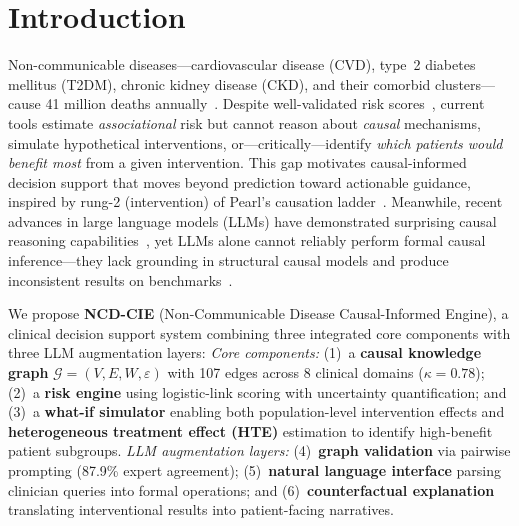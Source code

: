 \documentclass[runningheads]{llncs}
\begin{document}
\section{Introduction}\label{sec:intro}

Non-communicable diseases---cardiovascular disease (CVD), type~2
diabetes mellitus (T2DM), chronic kidney disease (CKD), and their
comorbid clusters---cause 41 million deaths
annually~\cite{who2021ncd}.
Despite well-validated risk scores~\cite{dagostino2008,hippisley2017qrisk3,score22021},
current tools estimate \emph{associational} risk but cannot reason about
\emph{causal} mechanisms, simulate hypothetical interventions, or---critically---identify
\emph{which patients would benefit most} from a given intervention.
This gap motivates causal-informed decision support that moves beyond
prediction toward actionable guidance, inspired by rung-2 (intervention)
of Pearl's causation ladder~\cite{pearl2018book}.
Meanwhile, recent advances in large language models (LLMs) have
demonstrated surprising causal reasoning
capabilities~\cite{ma2024causal,kiciman2023causal}, yet LLMs alone
cannot reliably perform formal causal inference---they lack grounding
in structural causal models and produce inconsistent results on
benchmarks~\cite{jin2023cladder}.

We propose \textbf{NCD-CIE} (Non-Communicable Disease Causal-Informed
Engine), a clinical decision support system combining three integrated
core components with three LLM augmentation layers:
\noindent\emph{Core components:}
(1)~a \textbf{causal knowledge graph} $\mathcal{G}=(V,E,W,\varepsilon)$
  with 107 edges across 8 clinical domains ($\kappa=0.78$);
(2)~a \textbf{risk engine} using logistic-link scoring with
  uncertainty quantification; and
(3)~a \textbf{what-if simulator} enabling both population-level
  intervention effects and \textbf{heterogeneous treatment effect (HTE)}
  estimation to identify high-benefit patient subgroups.
\emph{LLM augmentation layers:}
(4)~\textbf{graph validation} via pairwise prompting (87.9\% expert
  agreement);
(5)~\textbf{natural language interface} parsing clinician queries
  into formal operations; and
(6)~\textbf{counterfactual explanation} translating interventional
  results into patient-facing narratives.
\end{document}
